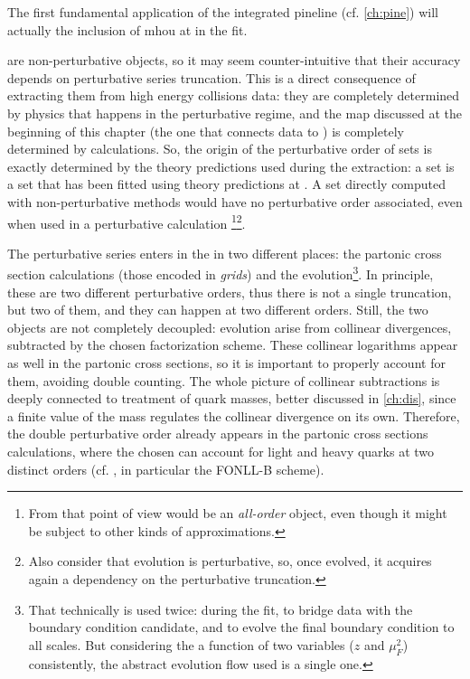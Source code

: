 
The first fundamental application of the integrated pineline (cf.
\cref{ch:pine}) will actually the inclusion of \acrfull{mhou} at \nnlo in the
 fit.

\pdfs are non-perturbative objects, so it may seem counter-intuitive that their
accuracy depends on perturbative series truncation.
%
This is a direct consequence of extracting them from high energy collisions
data: they are completely determined by physics that happens in the
perturbative regime, and the map discussed at the beginning of this chapter
(the one that connects data to \pdfs) is completely determined by \pqft
calculations.
%
So, the origin of the perturbative order of \pdf sets is exactly determined by
the theory predictions used during the extraction: a \nnlo set is a \pdf set
that has been fitted using theory predictions at \nnlo.
%
A \pdf set directly computed with non-perturbative methods would have no
perturbative order associated, even when used in a perturbative calculation
\footnote{
	From that point of view would be an \textit{all-order} object, even though
	it might be subject to other kinds of approximations.
}\footnote{
	Also consider that \dglap evolution is perturbative, so, once evolved, it
	acquires again a dependency on the perturbative truncation.
}.

The perturbative series enters in the \pdf in two different places: the
partonic cross section calculations (those encoded in \textit{grids}) and the
\dglap evolution\footnote{
	That technically is used twice: during the fit, to bridge data with the
	boundary condition candidate, and to evolve the final boundary condition to
	all scales.
	But considering the \pdf a function of two variables ($z$ and $\mu_F^2$)
	consistently, the abstract evolution flow used is a single one.
}.
%
In principle, these are two different perturbative orders, thus there is not a
single truncation, but two of them, and they can happen at two different
orders.
%
Still, the two objects are not completely decoupled: \dglap evolution arise
from collinear divergences, subtracted by the chosen factorization scheme.
These collinear logarithms appear as well in the partonic cross sections, so it
is important to properly account for them, avoiding double counting.
%
The whole picture of collinear subtractions is deeply connected to treatment of
quark masses, better discussed in \cref{ch:dis}, since a finite value of the
mass regulates the collinear divergence on its own.
%
Therefore, the double perturbative order already appears in the partonic cross
sections calculations, where the \fns chosen can account for light and heavy
quarks at two distinct orders (cf. \cite{Forte:2010ta}, in particular the
FONLL-B scheme).
